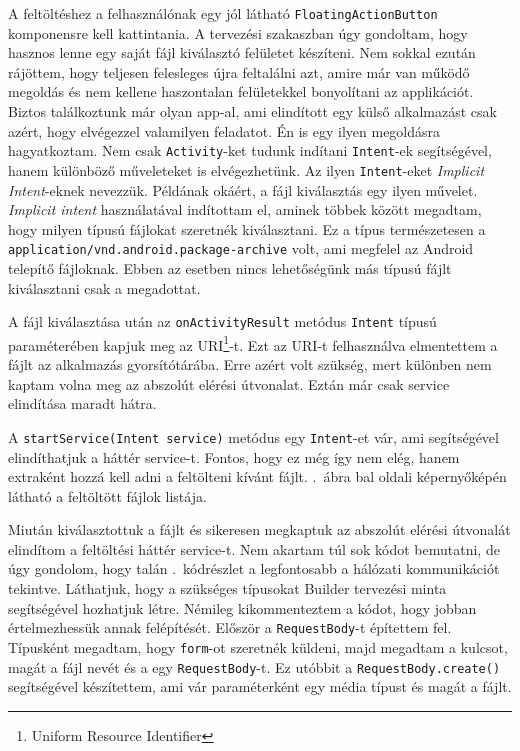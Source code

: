 \documentclass{thesis-ekf}
\theoremstyle{definition}
\theoremstyle{remark}
\begin{document}
A feltöltéshez a felhasználónak egy jól látható \texttt{FloatingActionButton} komponensre kell kattintania.
A tervezési szakaszban úgy gondoltam, hogy hasznos lenne egy saját fájl kiválasztó felületet készíteni.
Nem sokkal ezután rájöttem, hogy teljesen felesleges újra feltalálni azt, amire már van működő megoldás és nem kellene haszontalan felületekkel bonyolítani az applikációt.
Biztos találkoztunk már olyan app-al, ami elindított egy külső alkalmazást csak azért, hogy elvégezzel valamilyen feladatot.
Én is egy ilyen megoldásra hagyatkoztam.
Nem csak \texttt{Activity}-ket tudunk indítani \texttt{Intent}-ek segítségével, hanem különböző műveleteket is elvégezhetünk.
Az ilyen \texttt{Intent}-eket \emph{Implicit Intent}-eknek nevezzük.
Példának okáért, a fájl kiválasztás egy ilyen művelet.
\emph{Implicit intent} használatával indítottam el, aminek többek között megadtam, hogy milyen típusú fájlokat szeretnék kiválasztani.
Ez a típus természetesen a \texttt{application/vnd.android.package-archive} volt, ami megfelel az Android telepítő fájloknak.
Ebben az esetben nincs lehetőségünk más típusú fájlt kiválasztani csak a megadottat.

A fájl kiválasztása után az \texttt{onActivityResult} metódus \texttt{Intent} típusú paraméterében kapjuk meg az URI\footnote{Uniform Resource Identifier}-t.
Ezt az URI-t felhasználva elmentettem a fájlt az alkalmazás gyorsítótárába.
Erre azért volt szükség, mert különben nem kaptam volna meg az abszolút elérési útvonalat.
Eztán már csak service elindítása maradt hátra. 

A \texttt{startService(Intent service)} metódus egy \texttt{Intent}-et vár, ami segítségével elindíthatjuk a háttér service-t.
Fontos, hogy ez még így nem elég, hanem extraként hozzá kell adni a feltölteni kívánt fájlt.
.~ábra bal oldali képernyőképén látható a feltöltött fájlok listája.

Miután kiválasztottuk a fájlt és sikeresen megkaptuk az abszolút elérési útvonalát elindítom a feltöltési háttér service-t.
Nem akartam túl sok kódot bemutatni, de úgy gondolom, hogy talán .~kódrészlet a legfontosabb a hálózati kommunikációt tekintve.
Láthatjuk, hogy a szükséges típusokat Builder tervezési minta segítségével hozhatjuk létre.
Némileg kikommenteztem a kódot, hogy jobban értelmezhessük annak felépítését.
Először a \texttt{RequestBody}-t építettem fel.
Típusként megadtam, hogy \texttt{form}-ot szeretnék küldeni, majd megadtam a kulcsot, magát a fájl nevét és a egy \texttt{RequestBody}-t.
Ez utóbbit a \texttt{RequestBody.create()} segítségével készítettem, ami vár paraméterként egy média típust és magát a fájlt.
\end{document}

